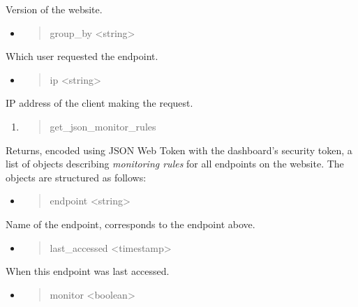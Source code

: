 Version of the website.

\begin{itemize}
\item
  \begin{quote}
  group\_by \textless{}string\textgreater{}
  \end{quote}
\end{itemize}

Which user requested the endpoint.

\begin{itemize}
\item
  \begin{quote}
  ip \textless{}string\textgreater{}
  \end{quote}
\end{itemize}

IP address of the client making the request.

\begin{enumerate}
\def\labelenumi{\arabic{enumi}.}
\setcounter{enumi}{2}
\item
  \begin{quote}
  get\_json\_monitor\_rules
  \end{quote}
\end{enumerate}

Returns, encoded using JSON Web Token with the dashboard's security
token, a list of objects describing \emph{monitoring rules} for all
endpoints on the website. The objects are structured as follows:

\begin{itemize}
\item
  \begin{quote}
  endpoint \textless{}string\textgreater{}
  \end{quote}
\end{itemize}

Name of the endpoint, corresponds to the endpoint above.

\begin{itemize}
\item
  \begin{quote}
  last\_accessed \textless{}timestamp\textgreater{}
  \end{quote}
\end{itemize}

When this endpoint was last accessed.

\begin{itemize}
\item
  \begin{quote}
  monitor \textless{}boolean\textgreater{}
  \end{quote}
\end{itemize}

